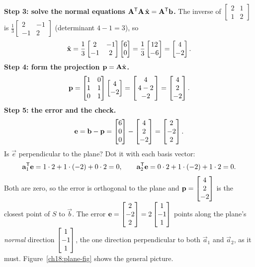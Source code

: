 \begin{example}
\textbf{Step 3: solve the normal equations $\mathbf{A}^{\mathsf{T}}\mathbf{A}\,\hat{\mathbf{x}}=\mathbf{A}^{\mathsf{T}}\mathbf{b}$.}
The inverse of $\begin{bmatrix}2&1\\1&2\end{bmatrix}$ is
$\frac{1}{3}\begin{bmatrix}2&-1\\-1&2\end{bmatrix}$ (determinant $4-1=3$), so
\[
  \hat{\mathbf{x}} = \frac{1}{3}\begin{bmatrix}2&-1\\-1&2\end{bmatrix}\begin{bmatrix}6\\0\end{bmatrix}
  = \frac{1}{3}\begin{bmatrix}12\\-6\end{bmatrix} = \begin{bmatrix}4\\-2\end{bmatrix}.
\]
\textbf{Step 4: form the projection $\mathbf{p}=\mathbf{A}\hat{\mathbf{x}}$.}
\[
  \mathbf{p} = \begin{bmatrix}1&0\\1&1\\0&1\end{bmatrix}\begin{bmatrix}4\\-2\end{bmatrix}
  = \begin{bmatrix}4\\\,4-2\,\\-2\end{bmatrix} = \begin{bmatrix}4\\2\\-2\end{bmatrix}.
\]
\textbf{Step 5: the error and the check.}
\[
  \mathbf{e} = \mathbf{b}-\mathbf{p} = \begin{bmatrix}6\\0\\0\end{bmatrix}-\begin{bmatrix}4\\2\\-2\end{bmatrix} = \begin{bmatrix}2\\-2\\2\end{bmatrix}.
\]
Is $\vec{e}$ perpendicular to the plane? Dot it with each basis vector:
\[
  \mathbf{a}_1^{\mathsf{T}}\mathbf{e} = 1\cdot2 + 1\cdot(-2) + 0\cdot2 = 0,
  \qquad
  \mathbf{a}_2^{\mathsf{T}}\mathbf{e} = 0\cdot2 + 1\cdot(-2) + 1\cdot2 = 0.
\]
Both are zero, so the error is orthogonal to the plane and $\mathbf{p}=\begin{bmatrix}4\\2\\-2\end{bmatrix}$ is the
closest point of $S$ to $\vec{b}$. The error $\mathbf{e}=\begin{bmatrix}2\\-2\\2\end{bmatrix}=2\begin{bmatrix}1\\-1\\1\end{bmatrix}$ points
along the plane's \emph{normal} direction $\begin{bmatrix}1\\-1\\1\end{bmatrix}$, the one direction perpendicular to
both $\vec{a}_1$ and $\vec{a}_2$, as it must. Figure~\ref{ch18:plane-fig} shows the general picture.
\end{example}

